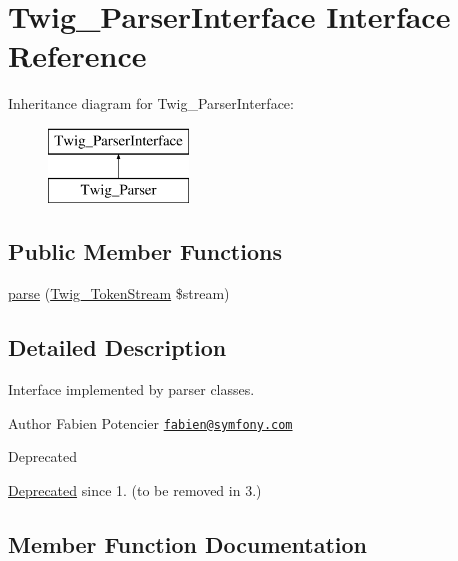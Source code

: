 \hypertarget{interface_twig___parser_interface}{}\section{Twig\+\_\+\+Parser\+Interface Interface Reference}
\label{interface_twig___parser_interface}
Inheritance diagram for Twig\+\_\+\+Parser\+Interface\+:\begin{figure}[H]
\begin{center}
\leavevmode
\includegraphics[height=2.000000cm]{interface_twig___parser_interface}
\end{center}
\end{figure}
\subsection*{Public Member Functions}
\begin{DoxyCompactItemize}
\item 
\hyperlink{interface_twig___parser_interface_a1de4218ce9c025eaa18ce55616c98fe7}{parse} (\hyperlink{class_twig___token_stream}{Twig\+\_\+\+Token\+Stream} \$stream)
\end{DoxyCompactItemize}


\subsection{Detailed Description}
Interface implemented by parser classes.

\begin{DoxyAuthor}{Author}
Fabien Potencier \href{mailto:fabien@symfony.com}{\tt fabien@symfony.\+com}
\end{DoxyAuthor}
\begin{DoxyRefDesc}{Deprecated}
\item[\hyperlink{deprecated__deprecated000019}{Deprecated}]since 1. (to be removed in 3.) \end{DoxyRefDesc}


\subsection{Member Function Documentation}
\hypertarget{interface_twig___parser_interface_a1de4218ce9c025eaa18ce55616c98fe7}{}
